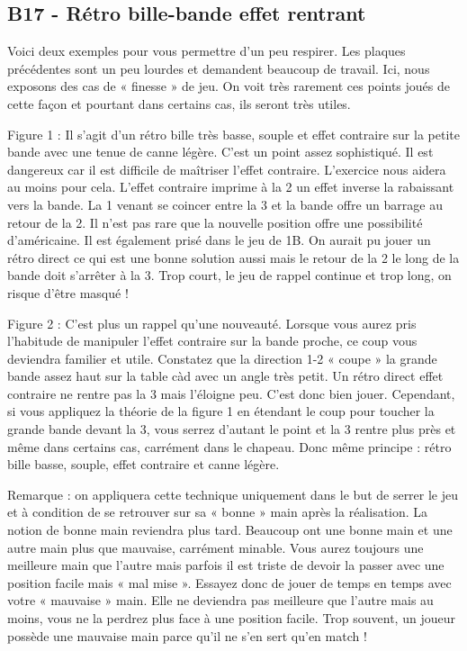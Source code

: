\subsection{B17 - Rétro bille-bande effet
rentrant}\label{b17---ruxe9tro-bille-bande-effet-rentrant}

Voici deux exemples pour vous permettre d'un peu respirer. Les plaques
précédentes sont un peu lourdes et demandent beaucoup de travail. Ici,
nous exposons des cas de « finesse » de jeu. On voit très rarement ces
points joués de cette façon et pourtant dans certains cas, ils seront
très utiles.

Figure 1 : Il s'agit d'un rétro bille très basse, souple et effet
contraire sur la petite bande avec une tenue de canne légère. C'est un
point assez sophistiqué. Il est dangereux car il est difficile de
maîtriser l'effet contraire. L'exercice nous aidera au moins pour cela.
L'effet contraire imprime à la 2 un effet inverse la rabaissant vers la
bande. La 1 venant se coincer entre la 3 et la bande offre un barrage au
retour de la 2. Il n'est pas rare que la nouvelle position offre une
possibilité d'américaine. Il est également prisé dans le jeu de 1B. On
aurait pu jouer un rétro direct ce qui est une bonne solution aussi mais
le retour de la 2 le long de la bande doit s'arrêter à la 3. Trop court,
le jeu de rappel continue et trop long, on risque d'être masqué !

Figure 2 : C'est plus un rappel qu'une nouveauté. Lorsque vous aurez
pris l'habitude de manipuler l'effet contraire sur la bande proche, ce
coup vous deviendra familier et utile. Constatez que la direction 1-2 «
coupe » la grande bande assez haut sur la table càd avec un angle très
petit. Un rétro direct effet contraire ne rentre pas la 3 mais l'éloigne
peu. C'est donc bien jouer. Cependant, si vous appliquez la théorie de
la figure 1 en étendant le coup pour toucher la grande bande devant la
3, vous serrez d'autant le point et la 3 rentre plus près et même dans
certains cas, carrément dans le chapeau. Donc même principe : rétro
bille basse, souple, effet contraire et canne légère.

Remarque : on appliquera cette technique uniquement dans le but de
serrer le jeu et à condition de se retrouver sur sa « bonne » main après
la réalisation. La notion de bonne main reviendra plus tard. Beaucoup
ont une bonne main et une autre main plus que mauvaise, carrément
minable. Vous aurez toujours une meilleure main que l'autre mais parfois
il est triste de devoir la passer avec une position facile mais « mal
mise ». Essayez donc de jouer de temps en temps avec votre « mauvaise »
main. Elle ne deviendra pas meilleure que l'autre mais au moins, vous ne
la perdrez plus face à une position facile. Trop souvent, un joueur
possède une mauvaise main parce qu'il ne s'en sert qu'en match !

